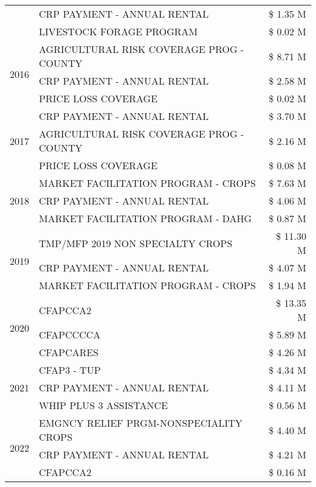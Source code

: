 \begin{tabular}{llr}
 & CRP PAYMENT - ANNUAL RENTAL & \$ 1.35 M \\
 & LIVESTOCK FORAGE PROGRAM & \$ 0.02 M \\
\cline{1-3}
\multirow[t]{3}{*}{2016} & AGRICULTURAL RISK COVERAGE PROG - COUNTY & \$ 8.71 M \\
 & CRP PAYMENT - ANNUAL RENTAL & \$ 2.58 M \\
 & PRICE LOSS COVERAGE & \$ 0.02 M \\
\cline{1-3}
\multirow[t]{3}{*}{2017} & CRP PAYMENT - ANNUAL RENTAL & \$ 3.70 M \\
 & AGRICULTURAL RISK COVERAGE PROG - COUNTY & \$ 2.16 M \\
 & PRICE LOSS COVERAGE & \$ 0.08 M \\
\cline{1-3}
\multirow[t]{3}{*}{2018} & MARKET FACILITATION PROGRAM - CROPS & \$ 7.63 M \\
 & CRP PAYMENT - ANNUAL RENTAL & \$ 4.06 M \\
 & MARKET FACILITATION PROGRAM - DAHG & \$ 0.87 M \\
\cline{1-3}
\multirow[t]{3}{*}{2019} & TMP/MFP 2019 NON SPECIALTY CROPS & \$ 11.30 M \\
 & CRP PAYMENT - ANNUAL RENTAL & \$ 4.07 M \\
 & MARKET FACILITATION PROGRAM - CROPS & \$ 1.94 M \\
\cline{1-3}
\multirow[t]{3}{*}{2020} & CFAPCCA2 & \$ 13.35 M \\
 & CFAPCCCCA & \$ 5.89 M \\
 & CFAPCARES & \$ 4.26 M \\
\cline{1-3}
\multirow[t]{3}{*}{2021} & CFAP3 - TUP & \$ 4.34 M \\
 & CRP PAYMENT - ANNUAL RENTAL & \$ 4.11 M \\
 & WHIP PLUS 3 ASSISTANCE & \$ 0.56 M \\
\cline{1-3}
\multirow[t]{3}{*}{2022} & EMGNCY RELIEF PRGM-NONSPECIALITY CROPS & \$ 4.40 M \\
 & CRP PAYMENT - ANNUAL RENTAL & \$ 4.21 M \\
 & CFAPCCA2 & \$ 0.16 M \\
\cline{1-3}
\bottomrule
\end{tabular}
